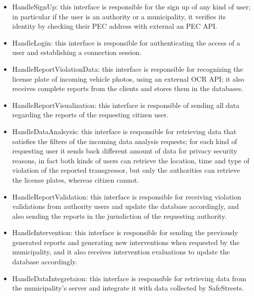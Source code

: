 \begin{itemize}
	\item HandleSignUp: this interface is responsible for the sign up of any kind of user; in particular if the user is an authority or a municipality, it verifies its identity by checking their PEC address with external an PEC API.
	\item HandleLogin: this interface is responsible for authenticating the access of a user and establishing a connection session.
	\item HandleReportViolationData: this interface is responsible for recognizing the license plate of incoming vehicle photos, using an external OCR API; it also receives complete reports from the clients and stores them in the databases.
	\item HandleReportVisualization: this interface is responsible of sending all data regarding the reports of the requesting citizen user.
	\item HandleDataAnalsysis: this interface is responsible for retrieving data that satisfies the filters of the incoming data analysis requests; for each kind of requesting user it sends back different amount of data for privacy security reasons, in fact both kinds of users can retrieve the location, time and type of violation of the reported transgressor, but only the authorities can retrieve the license plates, whereas citizen cannot.
	\item HandleReportValidation: this interface is responsible for receiving violation validations from authority users and update the database accordingly, and also sending the reports in the jurisdiction of the requesting authority.
	\item HandleIntervention: this interface is responsible for sending the previously generated reports and generating new interventions when requested by the municipality, and it also receives intervention evaluations to update the database accordingly.
	\item HandleDataIntegretaion: this interface is responsible for retrieving data from the municipality's server and integrate it with data collected by SafeStreets.
\end{itemize}